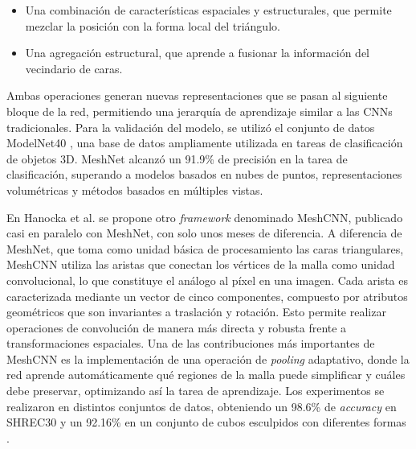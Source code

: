 \begin{itemize}
    \item Una combinación de características espaciales y estructurales, que permite mezclar la posición con la forma local del triángulo.
    \item Una agregación estructural, que aprende a fusionar la información del vecindario de caras.
\end{itemize}
Ambas operaciones generan nuevas representaciones que se pasan al siguiente bloque de la red, permitiendo una jerarquía de aprendizaje similar a las CNNs tradicionales. Para la validación del modelo, se utilizó el conjunto de datos ModelNet40 \cite{wu20153d}, una base de datos ampliamente utilizada en tareas de clasificación de objetos 3D. MeshNet alcanzó un 91.9\% de precisión en la tarea de clasificación, superando a modelos basados en nubes de puntos, representaciones volumétricas y métodos basados en múltiples vistas.

En Hanocka et al. \cite{hanocka2019meshcnn} se propone otro \textit{framework} denominado MeshCNN, publicado casi en paralelo con MeshNet, con solo unos meses de diferencia. A diferencia de MeshNet, que toma como unidad básica de procesamiento las caras triangulares, MeshCNN utiliza las aristas que conectan los vértices de la malla como unidad convolucional, lo que constituye el análogo al píxel en una imagen. Cada arista es caracterizada mediante un vector de cinco componentes, compuesto por atributos geométricos que son invariantes a traslación y rotación. Esto permite realizar operaciones de convolución de manera más directa y robusta frente a transformaciones espaciales. Una de las contribuciones más importantes de MeshCNN es la implementación de una operación de \textit{pooling} adaptativo, donde la red aprende automáticamente qué regiones de la malla puede simplificar y cuáles debe preservar, optimizando así la tarea de aprendizaje. Los experimentos se realizaron en distintos conjuntos de datos, obteniendo un 98.6\% de \textit{accuracy} en SHREC30 \cite{lian2011shape} y un 92.16\% en un conjunto de cubos esculpidos con diferentes formas \cite{latecki2000shape}.

